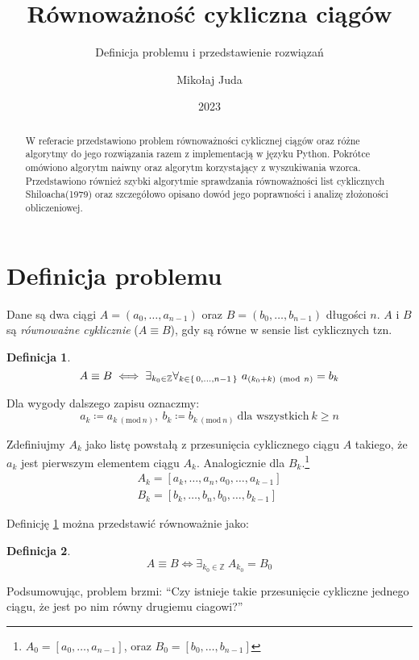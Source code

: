\documentclass{scrartcl}
\title{Równoważność cykliczna ciągów}
\subtitle{Definicja problemu i przedstawienie rozwiązań}
\date{2023}
\author{Mikołaj Juda}
\newcommand{\Mod}[1]{\ (\mathrm{mod}\ #1)}
\theoremstyle{definition}
\newtheorem{cyclic_equivalence_1}{Definicja}[section]
\theoremstyle{definition}
\newtheorem{cyclic_equivalence_2}
[cyclic_equivalence_1]{Definicja}
\begin{document}
\maketitle
\begin{abstract}
    W referacie przedstawiono
    problem równoważności cyklicznej ciągów
    oraz różne algorytmy do jego rozwiązania
    razem z implementacją w języku Python.
    Pokrótce omówiono algorytm naiwny
    oraz algorytm korzystający z wyszukiwania wzorca.
    Przedstawiono również
    szybki algorytmie sprawdzania równoważności
    list cyklicznych Shiloacha(1979)\cite{shiloach1979}
    oraz szczegółowo opisano dowód jego poprawności
    i analizę złożoności obliczeniowej.
\end{abstract}
\tableofcontents
\pagebreak
\section{Definicja problemu}
Dane są dwa ciągi
\(A=(a_0,\ldots,a_{n-1})\) oraz \(B=(b_0,\ldots,b_{n-1})\)
długości \(n\).\linebreak
\(A\) i \(B\) są \emph{równoważne cyklicznie}
(\(A\equiv B\)),
gdy są równe w sensie list cyklicznych tzn.
\begin{cyclic_equivalence_1}
    \label{def:cyclic_equivalence_1}
    \[A\equiv B \iff \exists_{k_0\in\mathbb{Z}}
        \forall_{k\in\set{0,\ldots,n-1}}\ a_{(k_0+k)\Mod{n}}=b_k\]
\end{cyclic_equivalence_1}

Dla wygody dalszego zapisu oznaczmy:
\[a_k\coloneq a_{k\Mod{n}},\ b_k\coloneq b_{k\Mod{n}}
    \ \text{dla wszystkich}\ k\ge n\]

Zdefiniujmy \(A_k\) jako listę powstałą z przesunięcia cyklicznego
ciągu \(A\) takiego, że \(a_k\) jest pierwszym elementem ciągu \(A_k\).
Analogicznie dla \(B_k\).\footnote{\(A_0=[a_0,\ldots,a_{n-1}]\),
oraz \(B_0=[b_0,\ldots,b_{n-1}]\)}
\begin{align*}
    A_k=[a_{k},\ldots,a_n,a_0,\ldots,a_{k-1}] \\
    B_k=[b_{k},\ldots,b_n,b_0,\ldots,b_{k-1}]
\end{align*}

Definicję \cref{def:cyclic_equivalence_1} można
przedstawić równoważnie jako:
\begin{cyclic_equivalence_2}
    \[A\equiv B \iff \exists_{k_0\in\mathbb{Z}}
        \ A_{k_0}=B_0\]
\end{cyclic_equivalence_2}

Podsumowując, problem brzmi:
\enquote{Czy istnieje takie przesunięcie cykliczne jednego ciągu,
    że jest po nim równy drugiemu ciagowi?}
\pagebreak
\end{document}
